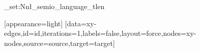 \begingroup
\ExplSyntaxOn\tl_set:Nn\l_semio_language_tl{en}\ExplSyntaxOff
\begin{VizFigure}[width=80,height=40,title={}]
[appearance=light]
[data={xy-edges},id={id},iterations={1},labels={false},layout={force},nodes={xy-nodes},source={source},target={target}]
\end{VizFigure}
\endgroup

